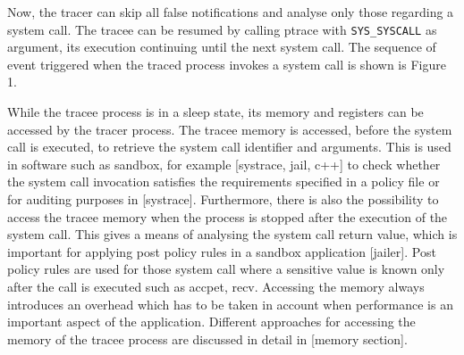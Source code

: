 Now, the tracer can skip all false notifications and analyse only those regarding a system call. The tracee can be resumed by calling ptrace with \lstinline$SYS_SYSCALL$ as argument, its execution continuing until the next system call.  The sequence of event triggered when the traced process invokes a system call is shown is Figure 1.

While the tracee process is in a sleep state, its memory and registers can be accessed by the tracer process. The tracee memory is accessed, before the system call is executed, to retrieve the system call identifier and arguments. This is used in software such as sandbox, for example [systrace, jail, c++] to check whether the system call invocation satisfies the requirements specified in a policy file or for auditing purposes in [systrace]. Furthermore, there is also the possibility to access the tracee memory when the process is stopped after the execution of the system call. This gives a means of analysing the system call return value, which is important for applying post policy rules in a sandbox application [jailer]. Post policy rules are used for those system call where a sensitive value is known only after the call is executed such as accpet, recv. 
Accessing the memory always introduces an overhead which has to be taken in account when performance is an important aspect of the application. Different approaches for accessing the memory of the tracee process are discussed in detail in [memory section]. 



